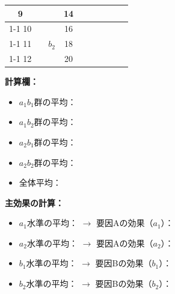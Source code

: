 \documentclass[a4paper,12pt]{ltjarticle}
\begin{document}
\begin{table}[ht]
\begin{tabular}{|c|c|c|c|c|c|c|c|c|c|}
		9        &  &  & 14   &   &   &   &   &   & \hspace{2cm}   \\ \cline{1-1}\cline{3-4}\cline{7-10}
		10       &  & \multirow{3}{*}{$b_2$} & 16   &   &   & \multirow{3}{*}{\hspace{2cm}}  & \multirow{3}{*}{\hspace{2cm}}  & \multirow{3}{*}{\hspace{2cm}}  & \hspace{2cm}   \\ \cline{1-1}\cline{4-4}\cline{10-10}
		11       &  &  & 18   &   &   &   &   &   & \hspace{2cm}   \\ \cline{1-1}\cline{4-4}\cline{10-10}
		12       &  &  & 20   &   &   &   &   &   & \hspace{2cm}   \\ \hline
	\end{tabular}
\end{table}

\textbf{計算欄：}
\begin{itemize}
	\item[] $a_1b_1$群の平均：\underline{\hspace{3cm}}
	\item[] $a_1b_2$群の平均：\underline{\hspace{3cm}}
	\item[] $a_2b_1$群の平均：\underline{\hspace{3cm}}
	\item[] $a_2b_2$群の平均：\underline{\hspace{3cm}}
	\item[] 全体平均：\underline{\hspace{3cm}}
\end{itemize}

\textbf{主効果の計算：}
\begin{itemize}
	\item[] $a_1$水準の平均：\underline{\hspace{3cm}} $\rightarrow$ 要因Aの効果（$a_1$）：\underline{\hspace{3cm}}
	\item[] $a_2$水準の平均：\underline{\hspace{3cm}} $\rightarrow$ 要因Aの効果（$a_2$）：\underline{\hspace{3cm}}
	\item[] $b_1$水準の平均：\underline{\hspace{3cm}} $\rightarrow$ 要因Bの効果（$b_1$）：\underline{\hspace{3cm}}
	\item[] $b_2$水準の平均：\underline{\hspace{3cm}} $\rightarrow$ 要因Bの効果（$b_2$）：\underline{\hspace{3cm}}
\end{itemize}
\end{document}
